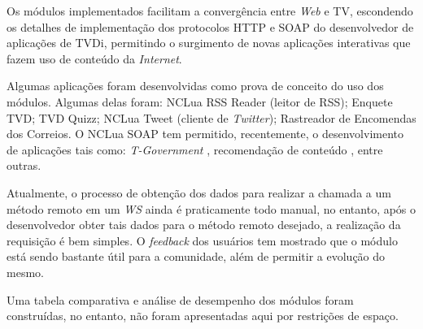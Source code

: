 Os módulos implementados facilitam a convergência entre \textit{Web} e TV, escondendo
os detalhes de implementação dos protocolos HTTP e SOAP do desenvolvedor
de aplicações de TVDi, permitindo o surgimento de novas aplicações interativas 
que fazem uso de conteúdo da \textit{Internet}.


Algumas aplicações foram desenvolvidas como prova de conceito do uso dos módulos. Algumas
delas foram: NCLua RSS Reader (leitor de RSS); Enquete TVD; TVD Quizz; NCLua Tweet (cliente de \textit{Twitter}); 
Rastreador de Encomendas dos Correios.
O NCLua SOAP tem permitido, recentemente, o desenvolvimento de aplicações tais como: \textit{T-Government}
\cite{tgov2010barbosa}, recomendação de conteúdo \cite{gatto2010BIPODiTVR}, entre outras. 

Atualmente, o processo de obtenção dos dados para realizar a chamada a um método remoto em um \textit{WS}
ainda é praticamente todo manual, no entanto, 
após o desenvolvedor obter tais dados para o método remoto desejado, a realização da requisição é bem simples.
O \textit{feedback} dos usuários tem mostrado que o módulo está sendo bastante útil para 
a comunidade, além de permitir a evolução do mesmo.

Uma tabela comparativa e análise de desempenho dos módulos foram construídas, no entanto, não
foram apresentadas aqui por restrições de espaço.
